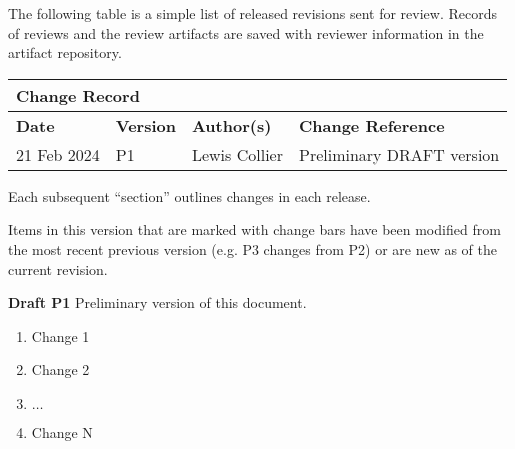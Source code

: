 
The following table is a simple list of released revisions sent for review.
Records of reviews and the review artifacts are saved with reviewer information in the \KNEADagencyName artifact repository.

\begin{table}[h]
	\centering 
		\begin{tabular}{|p{1.0in}|p{0.8in}|p{1.4in}|p{2.1in}|}
    \multicolumn{4}{l}{\bfseries Change Record} \\
		\hline
			{\bfseries Date}  &  {\bfseries Version} & {\bfseries Author(s)} & {\bfseries Change Reference} \\
		\hline
		\hline
			 21 Feb 2024	&	\centering	P1	&	{\raggedright Lewis Collier}	&	Preliminary DRAFT version  \\ \hline
		\hline		\hline				
  	\end{tabular}
\end{table}

Each subsequent ``section'' outlines changes in each release.

Items in this version that are marked with change bars have been modified from the most recent previous version (e.g. P3 changes from P2) or are new as of the current revision. 

{\bf Draft P1}
Preliminary version of this document.

\begin{enumerate}[itemindent=5pt,topsep=0pt,itemsep=0pt,partopsep=0pt, parsep=0pt]
	\item Change 1            
	\item Change 2
	\item $\ldots$
	\item Change N            
\end{enumerate}


